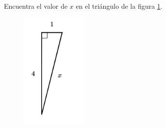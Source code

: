 \question[15]  Encuentra el valor de $x$ en el triángulo de la figura \ref{fig:lados_pitagoras_10}.
\begin{figure}[H]
    \begin{center}
        \includegraphics[width=0.3\textwidth]{../images/lados_pitagoras_10.png}
    \end{center}
    \caption{}
    \label{fig:lados_pitagoras_10}
\end{figure}